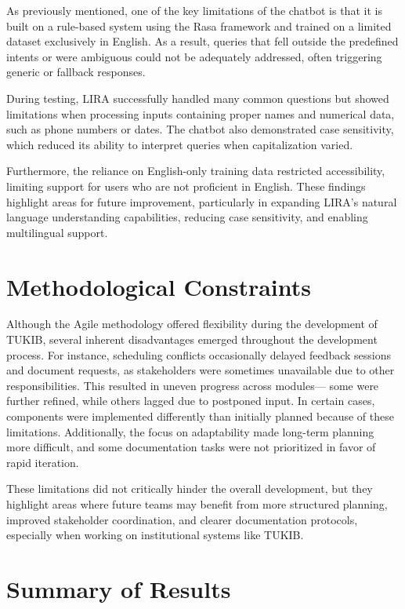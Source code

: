 As previously mentioned, one of the key limitations of the chatbot is that it is built on a rule-based system using the Rasa framework and trained on a limited dataset exclusively in English. As a result, queries that fell outside the predefined intents or were ambiguous could not be adequately addressed, often triggering generic or fallback responses.

During testing, LIRA successfully handled many common questions but showed limitations when processing inputs containing proper names and numerical data, such as phone numbers or dates. The chatbot also demonstrated case sensitivity, which reduced its ability to interpret queries when capitalization varied.

Furthermore, the reliance on English-only training data restricted accessibility, limiting support for users who are not proficient in English. These findings highlight areas for future improvement, particularly in expanding LIRA’s natural language understanding capabilities, reducing case sensitivity, and enabling multilingual support.

\section{Methodological Constraints}

Although the Agile methodology offered flexibility during the development of TUKIB, several inherent disadvantages emerged throughout the development process. For instance, scheduling conflicts occasionally delayed feedback sessions and document requests, as stakeholders were sometimes unavailable due to other responsibilities. This resulted in uneven progress across modules— some were further refined, while others lagged due to postponed input. In certain cases, components were implemented differently than initially planned because of these limitations. Additionally, the focus on adaptability made long-term planning more difficult, and some documentation tasks were not prioritized in favor of rapid iteration.

These limitations did not critically hinder the overall development, but they highlight areas where future teams may benefit from more structured planning, improved stakeholder coordination, and clearer documentation protocols, especially when working on institutional systems like TUKIB.

\section{Summary of Results}

